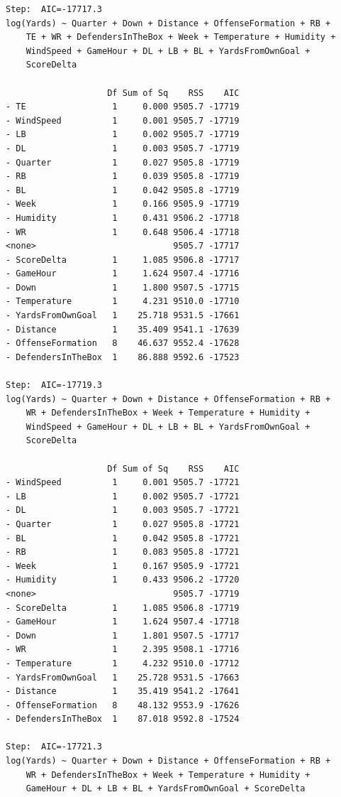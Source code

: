 \documentclass[
  super,
  preprint,
  3p]{elsarticle}
\begin{document}
\begin{verbatim}
Step:  AIC=-17717.3
log(Yards) ~ Quarter + Down + Distance + OffenseFormation + RB + 
    TE + WR + DefendersInTheBox + Week + Temperature + Humidity + 
    WindSpeed + GameHour + DL + LB + BL + YardsFromOwnGoal + 
    ScoreDelta

                    Df Sum of Sq    RSS    AIC
- TE                 1     0.000 9505.7 -17719
- WindSpeed          1     0.001 9505.7 -17719
- LB                 1     0.002 9505.7 -17719
- DL                 1     0.003 9505.7 -17719
- Quarter            1     0.027 9505.8 -17719
- RB                 1     0.039 9505.8 -17719
- BL                 1     0.042 9505.8 -17719
- Week               1     0.166 9505.9 -17719
- Humidity           1     0.431 9506.2 -17718
- WR                 1     0.648 9506.4 -17718
<none>                           9505.7 -17717
- ScoreDelta         1     1.085 9506.8 -17717
- GameHour           1     1.624 9507.4 -17716
- Down               1     1.800 9507.5 -17715
- Temperature        1     4.231 9510.0 -17710
- YardsFromOwnGoal   1    25.718 9531.5 -17661
- Distance           1    35.409 9541.1 -17639
- OffenseFormation   8    46.637 9552.4 -17628
- DefendersInTheBox  1    86.888 9592.6 -17523

Step:  AIC=-17719.3
log(Yards) ~ Quarter + Down + Distance + OffenseFormation + RB + 
    WR + DefendersInTheBox + Week + Temperature + Humidity + 
    WindSpeed + GameHour + DL + LB + BL + YardsFromOwnGoal + 
    ScoreDelta

                    Df Sum of Sq    RSS    AIC
- WindSpeed          1     0.001 9505.7 -17721
- LB                 1     0.002 9505.7 -17721
- DL                 1     0.003 9505.7 -17721
- Quarter            1     0.027 9505.8 -17721
- BL                 1     0.042 9505.8 -17721
- RB                 1     0.083 9505.8 -17721
- Week               1     0.167 9505.9 -17721
- Humidity           1     0.433 9506.2 -17720
<none>                           9505.7 -17719
- ScoreDelta         1     1.085 9506.8 -17719
- GameHour           1     1.624 9507.4 -17718
- Down               1     1.801 9507.5 -17717
- WR                 1     2.395 9508.1 -17716
- Temperature        1     4.232 9510.0 -17712
- YardsFromOwnGoal   1    25.728 9531.5 -17663
- Distance           1    35.419 9541.2 -17641
- OffenseFormation   8    48.132 9553.9 -17626
- DefendersInTheBox  1    87.018 9592.8 -17524

Step:  AIC=-17721.3
log(Yards) ~ Quarter + Down + Distance + OffenseFormation + RB + 
    WR + DefendersInTheBox + Week + Temperature + Humidity + 
    GameHour + DL + LB + BL + YardsFromOwnGoal + ScoreDelta


\end{verbatim}
\end{document}
